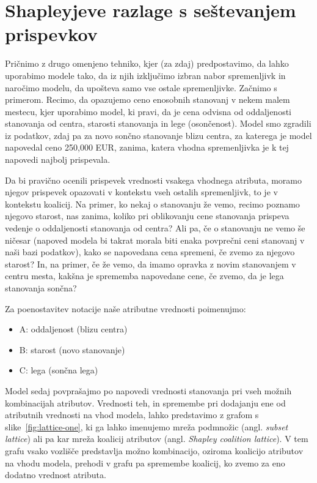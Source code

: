 \section{Shapleyjeve razlage s seštevanjem prispevkov}

Pričnimo z drugo omenjeno tehniko, kjer (za zdaj) predpostavimo, da lahko uporabimo modele tako, da iz njih izključimo izbran nabor spremenljivk in naročimo modelu, da upošteva samo vse ostale spremenljivke. Začnimo s primerom. Recimo, da opazujemo ceno enosobnih stanovanj v nekem malem mestecu, kjer uporabimo model, ki pravi, da je cena odvisna od oddaljenosti stanovanja od centra, starosti stanovanja in lege (osončenost). Model smo zgradili iz podatkov, zdaj pa za novo sončno stanovanje blizu centra, za katerega je model napovedal ceno 250,000 EUR, zanima, katera vhodna spremenljivka je k tej napovedi najbolj prispevala. 

Da bi pravično ocenili prispevek vrednosti vsakega vhodnega atributa, moramo njegov prispevek opazovati v kontekstu vseh ostalih spremenljivk, to je v kontekstu koalicij. Na primer, ko nekaj o stanovanju že vemo, recimo poznamo njegovo starost, nas zanima, koliko pri oblikovanju cene stanovanja prispeva vedenje o oddaljenosti stanovanja od centra? Ali pa, če o stanovanju ne vemo še ničesar (napoved modela bi takrat morala biti enaka povprečni ceni stanovanj v naši bazi podatkov), kako se napovedana cena spremeni, če zvemo za njegovo starost? In, na primer, če že vemo, da imamo opravka z novim stanovanjem v centru mesta, kakšna je sprememba napovedane cene, če zvemo, da je lega stanovanja sončna?

Za poenostavitev notacije naše atributne vrednosti poimenujmo:
\begin{itemize}
\item A: oddaljenost (blizu centra)
\item B: starost (novo stanovanje)
\item C: lega (sončna lega)
\end{itemize}
%
Model sedaj povprašajmo po napovedi vrednosti stanovanja pri vseh možnih kombinacijah atributov. Vrednosti teh, in spremembe pri dodajanju ene od atributnih vrednosti na vhod modela, lahko predstavimo z grafom s slike~\ref{fig:lattice-one}, ki ga lahko imenujemo mreža podmnožic (angl. {\em subset lattice}) ali pa kar mreža koalicij atributov (angl. {\em Shapley coalition lattice}).
%
%
V tem grafu vsako vozlišče predstavlja možno kombinacijo, oziroma koalicijo atributov na vhodu modela, prehodi v grafu pa spremembe koalicij, ko zvemo za eno dodatno vrednost atributa.

